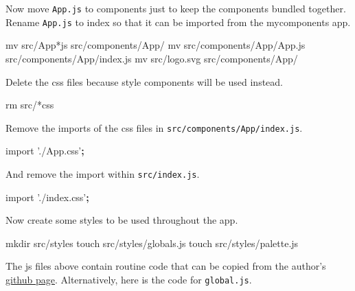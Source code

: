\documentclass[]{book}
\newenvironment{Shaded}{\begin{snugshade}}{\end{snugshade}}
\newcommand{\KeywordTok}[1]{\textcolor[rgb]{0.13,0.29,0.53}{\textbf{#1}}}
\newcommand{\StringTok}[1]{\textcolor[rgb]{0.31,0.60,0.02}{#1}}
\newcommand{\FunctionTok}[1]{\textcolor[rgb]{0.00,0.00,0.00}{#1}}
\newcommand{\ExtensionTok}[1]{#1}
\newcommand{\NormalTok}[1]{#1}
\begin{document}
Now move \texttt{App.js} to components just to keep the components
bundled together. Rename \texttt{App.js} to index so that it can be
imported from the mycomponents app.

\begin{Shaded}
\begin{Highlighting}[]
\FunctionTok{mv}\NormalTok{ src/App*js src/components/App/}
\FunctionTok{mv}\NormalTok{ src/components/App/App.js src/components/App/index.js}
\FunctionTok{mv}\NormalTok{ src/logo.svg src/components/App/}
\end{Highlighting}
\end{Shaded}

Delete the css files because style components will be used instead.

\begin{Shaded}
\begin{Highlighting}[]
\FunctionTok{rm}\NormalTok{ src/*css}
\end{Highlighting}
\end{Shaded}

Remove the imports of the css files in
\texttt{src/components/App/index.js}.

\begin{Shaded}
\begin{Highlighting}[]
\ExtensionTok{import} \StringTok{'./App.css'}\KeywordTok{;}
\end{Highlighting}
\end{Shaded}

And remove the import within \texttt{src/index.js}.

\begin{Shaded}
\begin{Highlighting}[]
\ExtensionTok{import} \StringTok{'./index.css'}\KeywordTok{;}
\end{Highlighting}
\end{Shaded}

Now create some styles to be used throughout the app.

\begin{Shaded}
\begin{Highlighting}[]
\FunctionTok{mkdir}\NormalTok{ src/styles}
\FunctionTok{touch}\NormalTok{ src/styles/globals.js}
\FunctionTok{touch}\NormalTok{ src/styles/palette.js}
\end{Highlighting}
\end{Shaded}

The js files above contain routine code that can be copied from the
author's \href{https://github.com/treyhuffine/hn-clone}{github page}.
Alternatively, here is the code for \texttt{global.js}.
\end{document}
